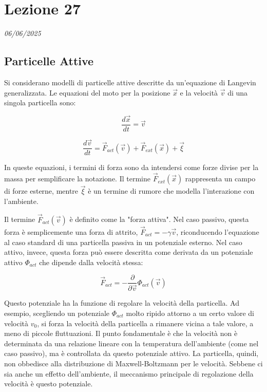 \chapter{Lezione 27}
\label{capitolo_27}
\textit{06/06/2025}

\section{Particelle Attive}
Si considerano modelli di particelle attive descritte da un'equazione di Langevin generalizzata. Le equazioni del moto per la posizione $\vec{x}$ e la velocità $\vec{v}$ di una singola particella sono:

\begin{equation} \label{eq:ch27_1}
\frac{d\vec{x}}{dt}=\vec{v}
\end{equation}

\begin{equation} \label{eq:ch27_2}
\frac{d\vec{v}}{dt}=\vec{F}_{act}(\vec{v})+\vec{F}_{ext}(\vec{x})+\vec{\xi}
\end{equation}

In queste equazioni, i termini di forza sono da intendersi come forze divise per la massa per semplificare la notazione. Il termine $\vec{F}_{ext}(\vec{x})$ rappresenta un campo di forze esterne, mentre $\vec{\xi}$ è un termine di rumore che modella l'interazione con l'ambiente.



Il termine $\vec{F}_{act}(\vec{v})$ è definito come la "forza attiva". Nel caso passivo, questa forza è semplicemente una forza di attrito, $\vec{F}_{act} = -\gamma\vec{v}$, riconducendo l'equazione al caso standard di una particella passiva in un potenziale esterno.
Nel caso attivo, invece, questa forza può essere descritta come derivata da un potenziale attivo $\Phi_{act}$ che dipende dalla velocità stessa:

\begin{equation} \label{eq:ch27_3}
\vec{F}_{act}=-\frac{\partial}{\partial\vec{v}}\Phi_{act}(\vec{v})
\end{equation}

Questo potenziale ha la funzione di regolare la velocità della particella. Ad esempio, scegliendo un potenziale $\Phi_{act}$ molto ripido attorno a un certo valore di velocità $v_0$, si forza la velocità della particella a rimanere vicina a tale valore, a meno di piccole fluttuazioni.
Il punto fondamentale è che la velocità non è determinata da una relazione lineare con la temperatura dell'ambiente (come nel caso passivo), ma è controllata da questo potenziale attivo.
La particella, quindi, non obbedisce alla distribuzione di Maxwell-Boltzmann per le velocità. Sebbene ci sia anche un effetto dell'ambiente, il meccanismo principale di regolazione della velocità è questo potenziale.


